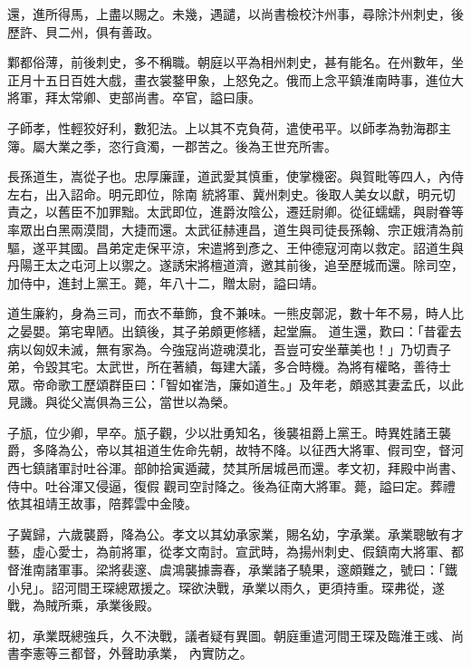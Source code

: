 \begin{pinyinscope}
 還，進所得馬，上盡以賜之。未幾，遇譴，以尚書檢校汴州事，尋除汴州刺史，後歷許、貝二州，俱有善政。



 鄴都俗薄，前後刺史，多不稱職。朝庭以平為相州刺史，甚有能名。在州數年，坐正月十五日百姓大戲，畫衣裳鍪甲象，上怒免之。俄而上念平鎮淮南時事，進位大將軍，拜太常卿、吏部尚書。卒官，謚曰康。



 子師孝，性輕狡好利，數犯法。上以其不克負荷，遣使弔平。以師孝為勃海郡主簿。屬大業之季，恣行貪濁，一郡苦之。後為王世充所害。



 長孫道生，嵩從子也。忠厚廉謹，道武愛其慎重，使掌機密。與賀毗等四人，內侍左右，出入詔命。明元即位，除南
 統將軍、冀州刺史。後取人美女以獻，明元切責之，以舊臣不加罪黜。太武即位，進爵汝陰公，遷廷尉卿。從征蠕蠕，與尉眷等率眾出白黑兩漠間，大捷而還。太武征赫連昌，道生與司徒長孫翰、宗正娥清為前驅，遂平其國。昌弟定走保平涼，宋遣將到彥之、王仲德寇河南以救定。詔道生與丹陽王太之屯河上以禦之。遂誘宋將檀道濟，邀其前後，追至歷城而還。除司空，加侍中，進封上黨王。薨，年八十二，贈太尉，謚曰靖。



 道生廉約，身為三司，而衣不華飾，食不兼味。一熊皮鄣泥，數十年不易，時人比之晏嬰。第宅卑陋。出鎮後，其子弟頗更修繕，起堂廡。
 道生還，歎曰：「昔霍去病以匈奴未滅，無有家為。今強寇尚遊魂漠北，吾豈可安坐華美也！」乃切責子弟，令毀其宅。太武世，所在著績，每建大議，多合時機。為將有權略，善待士眾。帝命歌工歷頌群臣曰：「智如崔浩，廉如道生。」及年老，頗惑其妻孟氏，以此見譏。與從父嵩俱為三公，當世以為榮。



 子瓬，位少卿，早卒。瓬子觀，少以壯勇知名，後襲祖爵上黨王。時異姓諸王襲爵，多降為公，帝以其祖道生佐命先朝，故特不降。以征西大將軍、假司空，督河西七鎮諸軍討吐谷渾。部帥拾寅遁藏，焚其所居城邑而還。孝文初，拜殿中尚書、侍中。吐谷渾又侵逼，復假
 觀司空討降之。後為征南大將軍。薨，謚曰定。葬禮依其祖靖王故事，陪葬雲中金陵。



 子冀歸，六歲襲爵，降為公。孝文以其幼承家業，賜名幼，字承業。承業聰敏有才藝，虛心愛士，為前將軍，從孝文南討。宣武時，為揚州刺史、假鎮南大將軍、都督淮南諸軍事。梁將裴邃、虞鴻襲據壽春，承業諸子驍果，邃頗難之，號曰：「鐵小兒」。詔河間王琛總眾援之。琛欲決戰，承業以雨久，更須持重。琛弗從，遂戰，為賊所乘，承業後殿。



 初，承業既總強兵，久不決戰，議者疑有異圖。朝庭重遣河間王琛及臨淮王彧、尚書李憲等三都督，外聲助承業，
 內實防之。




\end{pinyinscope}
